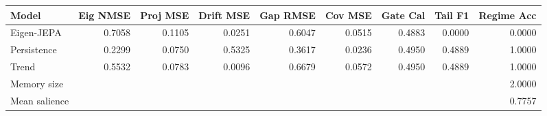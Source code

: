 \begin{tabular}{lrrrrrrrr}
\toprule
Model & Eig NMSE & Proj MSE & Drift MSE & Gap RMSE & Cov MSE & Gate Cal & Tail F1 & Regime Acc \\
\midrule
Eigen-JEPA & 0.7058 & 0.1105 & 0.0251 & 0.6047 & 0.0515 & 0.4883 & 0.0000 & 0.0000 \\
Persistence & 0.2299 & 0.0750 & 0.5325 & 0.3617 & 0.0236 & 0.4950 & 0.4889 & 1.0000 \\
Trend & 0.5532 & 0.0783 & 0.0096 & 0.6679 & 0.0572 & 0.4950 & 0.4889 & 1.0000 \\
\midrule
Memory size & \multicolumn{8}{r}{2.0000} \\
Mean salience & \multicolumn{8}{r}{0.7757} \\
\bottomrule
\end{tabular}